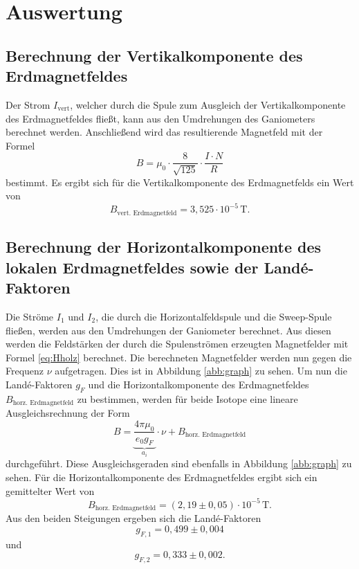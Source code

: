 \section{Auswertung}

\subsection{Berechnung der Vertikalkomponente des Erdmagnetfeldes}

Der Strom $I_\text{vert}$, welcher durch die Spule zum Ausgleich der Vertikalkomponente des Erdmagnetfeldes fließt, kann aus den Umdrehungen des Ganiometers berechnet
werden. Anschließend wird das resultierende Magnetfeld mit der Formel
\begin{equation}
  B= \mu_0 \cdot  \frac{8}{\sqrt {125}}\cdot \frac{I\cdot N}{R}
  \label{eq:Hholz}
\end{equation}
bestimmt. Es ergibt sich für die Vertikalkomponente des Erdmagnetfelds ein Wert von
\begin{equation*}
  B_\text{vert. Erdmagnetfeld}=3,525\cdot 10^{-5}\,\text{T}.
\end{equation*}

\subsection{Berechnung der Horizontalkomponente des lokalen Erdmagnetfeldes sowie der Landé-Faktoren}
Die Ströme $I_1$ und $I_2$, die durch die Horizontalfeldspule und die Sweep-Spule fließen, werden aus den Umdrehungen der Ganiometer berechnet.
Aus diesen werden die Feldstärken der durch die Spulenströmen erzeugten Magnetfelder mit Formel \eqref{eq:Hholz}
berechnet.
Die berechneten Magnetfelder werden nun gegen die Frequenz $\nu$ aufgetragen.
Dies ist in Abbildung \ref{abb:graph} zu sehen.
Um nun die Landé-Faktoren $g_F$ und die Horizontalkomponente des Erdmagnetfeldes $B_\text{horz. Erdmagnetfeld}$ zu bestimmen, werden für beide Isotope eine lineare Ausgleichsrechnung der Form
\begin{equation}
  B=\underbrace{\frac{4\pi \mu_0}{e_0g_F}}_{a_i}\cdot \nu+B_\text{horz. Erdmagnetfeld}
\end{equation}
durchgeführt.
Diese Ausgleichsgeraden sind ebenfalls in Abbildung \ref{abb:graph} zu sehen.
Für die Horizontalkomponente des Erdmagnetfeldes ergibt sich ein gemittelter Wert von
\begin{equation}
  B_\text{horz. Erdmagnetfeld}=(2,19\pm0,05)\cdot 10^{-5}\,\text{T}.
\end{equation}
Aus den beiden Steigungen ergeben sich die Landé-Faktoren
\begin{equation}
  g_{F,1}=0,499\pm0,004
\end{equation}
und
\begin{equation}
  g_{F,2}=0,333\pm0,002.
\end{equation}

